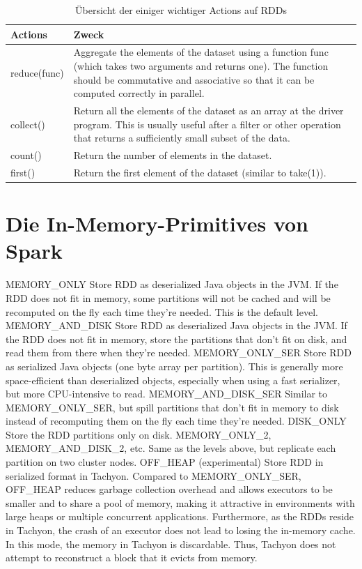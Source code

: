 \begin{table}[!ht]
\centering
\begin{tabular}{| p{5cm} | p{8cm} | }
\hline
Actions & Zweck \\ \hline \hline
reduce(func) & Aggregate the elements of the dataset using a function func (which takes two arguments and returns one). The function should be commutative and associative so that it can be computed correctly in parallel.  \\ \hline 
collect() & Return all the elements of the dataset as an array at the driver program. This is usually useful after a filter or other operation that returns a sufficiently small subset of the data. \\ \hline 
count() & Return the number of elements in the dataset. \\ \hline 
first() & Return the first element of the dataset (similar to take(1)). \\ \hline 
\end{tabular}
\caption{Übersicht der einiger wichtiger Actions auf RDDs}
	\label{tab:actions}
\end{table}

\section{Die In-Memory-Primitives von Spark}
\label{section:in Memory Primvs}

MEMORY_ONLY	Store RDD as deserialized Java objects in the JVM. If the RDD does not fit in memory, some partitions will not be cached and will be recomputed on the fly each time they're needed. This is the default level.
MEMORY_AND_DISK	Store RDD as deserialized Java objects in the JVM. If the RDD does not fit in memory, store the partitions that don't fit on disk, and read them from there when they're needed.
MEMORY_ONLY_SER	Store RDD as serialized Java objects (one byte array per partition). This is generally more space-efficient than deserialized objects, especially when using a fast serializer, but more CPU-intensive to read.
MEMORY_AND_DISK_SER	Similar to MEMORY_ONLY_SER, but spill partitions that don't fit in memory to disk instead of recomputing them on the fly each time they're needed.
DISK_ONLY	Store the RDD partitions only on disk.
MEMORY_ONLY_2, MEMORY_AND_DISK_2, etc.	Same as the levels above, but replicate each partition on two cluster nodes.
OFF_HEAP (experimental)	Store RDD in serialized format in Tachyon. Compared to MEMORY_ONLY_SER, OFF_HEAP reduces garbage collection overhead and allows executors to be smaller and to share a pool of memory, making it attractive in environments with large heaps or multiple concurrent applications. Furthermore, as the RDDs reside in Tachyon, the crash of an executor does not lead to losing the in-memory cache. In this mode, the memory in Tachyon is discardable. Thus, Tachyon does not attempt to reconstruct a block that it evicts from memory.


